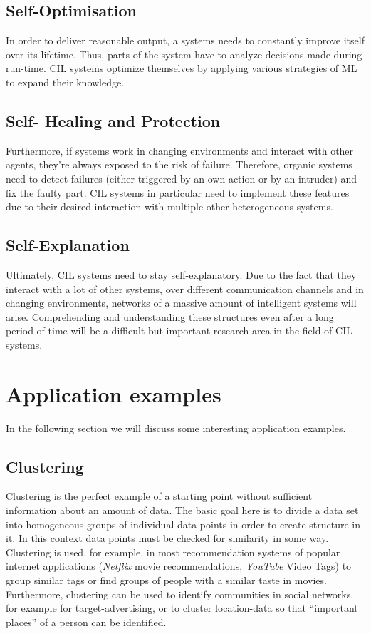 \documentclass[conference]{IEEEtran}
\begin{document}
\subsection{Self-Optimisation}
In order to deliver reasonable output, a systems needs to constantly improve itself over its lifetime. Thus, parts of 
the system have to analyze decisions made during run-time.
CIL systems optimize themselves by applying various strategies of ML to expand their knowledge.

\subsection{Self- Healing and Protection}
Furthermore, if systems work in changing environments and interact with other agents, they're always exposed to 
the risk of failure. Therefore, organic systems need to detect failures (either triggered by an own action or by an intruder) 
and fix the faulty part.
CIL systems in particular need to implement these features due to their desired interaction with multiple 
other heterogeneous systems.

\subsection{Self-Explanation}
Ultimately, CIL systems need to stay self-explanatory. Due to the fact that they interact with a lot of other systems, over 
different communication channels and in changing environments, networks of a massive amount of intelligent systems will arise. 
Comprehending and understanding these structures even after a long period of time will be a difficult but important research 
area in the field of CIL systems\cite{Organic:schloer}.

\section{Application examples}
In the following section we will discuss some interesting application examples.

\subsection{Clustering}
Clustering is the perfect example of a starting point without sufficient information about an amount of data. 
The basic goal here is to divide a data set into homogeneous groups of individual data points in order to create structure in it.
In this context data points must be checked for similarity in some way.
Clustering is used, for example, in most recommendation systems of popular internet applications 
(\textit{Netflix} movie recommendations, \textit{YouTube} Video Tags\cite{YouTube:pasca}) to group similar tags or find groups 
of people with a similar taste in movies.
Furthermore, clustering can be used to identify communities in social networks, for example for target-advertising, or to cluster location-data so that ``important places'' of a person can be identified\cite{DJ:frankowski}.
\end{document}
